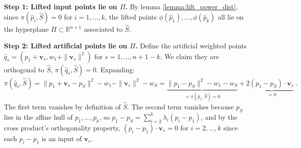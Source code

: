 \documentclass[12pt]{article}
\makeatletter
\theoremstyle{definition}
\theoremstyle{remark}
\renewenvironment{proof}[1][\proofname]{\par
  \pushQED{\qed}%
  \normalfont \footnotesize \topsep6\p@\@plus6\p@\relax
  \list{}{\leftmargin=2em
          \settowidth{\itemindent}{\itshape#1}%
          \labelwidth=\itemindent
          \parsep=0pt \listparindent=\parindent 
  }
  \item[\hskip\labelsep
        \itshape
    #1\@addpunct{.}]\ignorespaces
}{%
  \popQED\endlist\@endpefalse
}
\makeatother
\begin{document}
\begin{proof}
~\\
\noindent
\textbf{Step 1: Lifted input points lie on $\Pi$.} By lemma \ref{lemma:lift_power_dist}, since $\pi(\hat p_i, \hat S) = 0$ for $i = 1, \ldots, k$, 
the lifted points $\phi(\hat p_1), \ldots, \phi(\hat p_k)$ all lie on the 
hyperplane $\Pi \subset \mathbb{R}^{n+1}$ associated to $\hat S$.


\bigskip \noindent
\textbf{Step 2: Lifted artificial points lie on $\Pi$.} Define the artificial weighted points $\hat q_s = (p_1 + \mathbf{v}_s, 
w_1 + \|\mathbf{v}_s\|^2)$ for $s = 1, \ldots, n+1-k$. We claim they are orthogonal to $\hat S$,
$\pi(\hat q_s, \hat S) = 0$. Expanding:
\begin{equation*}
\pi(\hat q_s, \hat S) = \|p_1 + \mathbf{v}_s - p_S\|^2 - w_1 - 
\|\mathbf{v}_s\|^2 - w_S
= \underbrace{\|p_1 - p_S\|^2 - w_1 - w_S}_{=\pi(\hat p_1, \hat S)= 0} + 
2\underbrace{(p_1 - p_S)\cdot\mathbf{v}_s}_{=0}\  .
\end{equation*}
The first term vanishes by definition of $\hat S$. The second term vanishes 
because $p_S$ lies in the affine hull of $p_1, \ldots, p_k$, so $p_1 - p_S = \sum_{i=2}^k \lambda_i (p_i - p_1)$, and by the cross product's orthogonality property, $(p_i - p_1) \cdot \mathbf{v}_s = 0$ for $i = 2, \ldots, k$ since each $p_i - p_1$ is an input of $\mathbf{v}_s$.


\end{proof}
\end{document}
